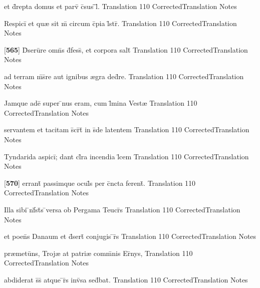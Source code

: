 \latline
  {et d\={\macron {\i}}repta domus et parv\={\macron {\i}} c\={}sus \={\macron {\i}}\={}l\={\macron {\i}}.}
  { Translation }
  {110}
  { CorrectedTranslation }
  { Notes }


\latline
  {Respici\={} et qu{\ae} sit m\={} circum c\={}pia l\={}str\={}.}
  { Translation }
  {110}
  { CorrectedTranslation }
  { Notes }


\latline
  {[\textbf{565}] D\={}seru\={}re omn\={}s d\={}fess\={\macron {\i}}, et corpora salt\={}}
  { Translation }
  {110}
  { CorrectedTranslation }
  { Notes }


\latline
  {ad terram m\={\macron {\i}}s\={}re aut ignibus {\ae}gra ded\={}re.}
  { Translation }
  {110}
  { CorrectedTranslation }
  { Notes }


\latline
  {Jamque ade\={} super \={}nus eram, cum l\={\macron {\i}}mina Vest{\ae}}
  { Translation }
  {110}
  { CorrectedTranslation }
  { Notes }


\latline
  {servantem et tacitam s\={}cr\={}t\={} in s\={}de latentem}
  { Translation }
  {110}
  { CorrectedTranslation }
  { Notes }


\latline
  {Tyndarida aspici\={}; dant cl\={}ra incendia l\={}cem}
  { Translation }
  {110}
  { CorrectedTranslation }
  { Notes }


\latline
  {[\textbf{570}] errant\={\macron {\i}} passimque ocul\={}s per c\={}ncta ferent\={\macron {\i}}.}
  { Translation }
  {110}
  { CorrectedTranslation }
  { Notes }


\latline
  {Illa sibi \={\macron {\i}}nf\={}st\={}s \={}versa ob Pergama Teucr\={}s}
  { Translation }
  {110}
  { CorrectedTranslation }
  { Notes }


\latline
  {et poen\={}s Danaum et d\={}sert\={\macron {\i}} conjugis \={\macron {\i}}r\={}s}
  { Translation }
  {110}
  { CorrectedTranslation }
  { Notes }


\latline
  {pr{\ae}metu\={}ns, Troj{\ae} at patri{\ae} comm\={}nis Er\={\macron {\i}}nys,}
  { Translation }
  {110}
  { CorrectedTranslation }
  { Notes }


\latline
  {abdiderat s\={}s\={} atque \={}r\={\macron {\i}}s inv\={\macron {\i}}sa sed\={}bat.}
  { Translation }
  {110}
  { CorrectedTranslation }
  { Notes }


